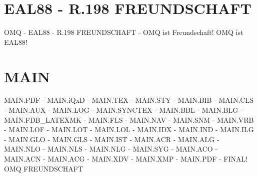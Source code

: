 \documentclass{MAIN}
\begin{document}
\maketitle
\section*{EAL88 - R.198 FREUNDSCHAFT}
OMQ - EAL88 - R.198 FREUNDSCHAFT - OMQ ist Freundschaft! OMQ ist EAL88!
\section*{MAIN}
MAIN.PDF - MAIN.iQxD - MAIN.TEX - MAIN.STY - MAIN.BIB - MAIN.CLS - MAIN.AUX - MAIN.LOG - MAIN.SYNCTEX - MAIN.BBL - MAIN.BLG - MAIN.FDB_LATEXMK - MAIN.FLS - MAIN.NAV - MAIN.SNM - MAIN.VRB - MAIN.LOF - MAIN.LOT - MAIN.LOL - MAIN.IDX - MAIN.IND - MAIN.ILG - MAIN.GLO - MAIN.GLS - MAIN.IST - MAIN.ACR - MAIN.ALG - MAIN.NLO - MAIN.NLS - MAIN.NLG - MAIN.SYG - MAIN.ACO - MAIN.ACN - MAIN.ACG - MAIN.XDV - MAIN.XMP - MAIN.PDF - FINAL!
\cite{omq_eal88}
\ac{OMQ}
\ac{FREUNDSCHAFT}

\printindex
\printglossary
\printnomenclature
\printacronyms
\end{document}
